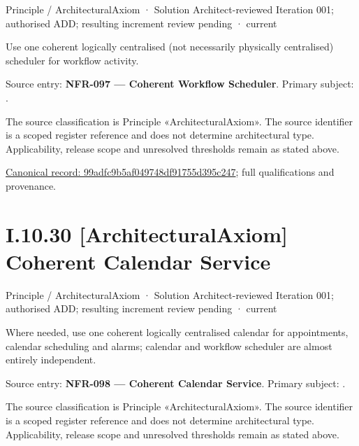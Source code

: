 \label{element:99adfc9b5af049748df91755d395c247}
{\small Principle / ArchitecturalAxiom · Solution Architect-reviewed Iteration 001; authorised ADD; resulting increment review pending · current}\par

Use one coherent logically centralised (not necessarily physically centralised) scheduler for workflow activity.



Source entry: \textbf{NFR-097 — Coherent Workflow Scheduler}. Primary subject: \texttt{}.



The source classification is Principle «ArchitecturalAxiom». The source identifier is a scoped register reference and does not determine architectural type. Applicability, release scope and unresolved thresholds remain as stated above.


{\footnotesize \href{../../../../../../../continuum/motivation/principle/architectural-axiom/99adfc9b5af049748df91755d395c247.md}{Canonical record: 99adfc9b5af049748df91755d395c247}; full qualifications and provenance.}\par
\section*{I.10.30 [ArchitecturalAxiom] Coherent Calendar Service}
\label{navigation:I.10.30}

\label{element:a9b1d031fa844057aa030f09e4fa6b01}
{\small Principle / ArchitecturalAxiom · Solution Architect-reviewed Iteration 001; authorised ADD; resulting increment review pending · current}\par

Where needed, use one coherent logically centralised calendar for appointments, calendar scheduling and alarms; calendar and workflow scheduler are almost entirely independent.



Source entry: \textbf{NFR-098 — Coherent Calendar Service}. Primary subject: \texttt{}.



The source classification is Principle «ArchitecturalAxiom». The source identifier is a scoped register reference and does not determine architectural type. Applicability, release scope and unresolved thresholds remain as stated above.


